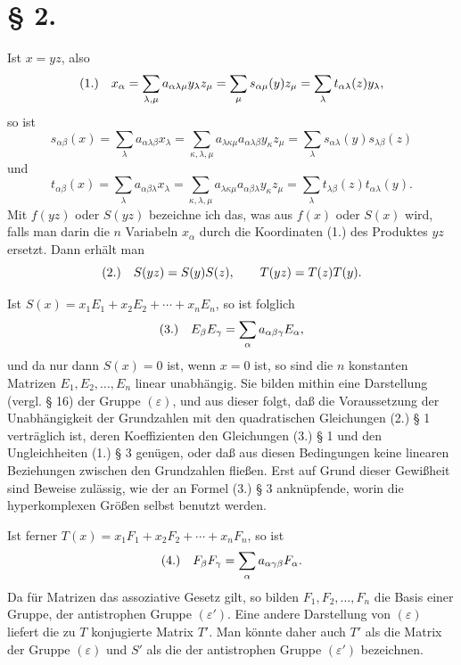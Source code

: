 \documentclass[11pt]{article}
\newcommand{\eps}{\varepsilon}
\newcommand{\fnum}[1]{\textup{(\ensuremath{#1}.)}\quad}
\begin{document}
\section*{§ 2.}

Ist $x=yz$, also
\[
\fnum{1} x_\alpha=\sum_{\lambda,\mu}a_{\alpha\lambda\mu}y_\lambda z_\mu
=\sum_\mu s_{\alpha\mu}(y)z_\mu=\sum_\lambda t_{\alpha\lambda}(z)y_\lambda,
\]
so ist
\[
s_{\alpha\beta}(x)=\sum_\lambda a_{\alpha\lambda\beta}x_\lambda
 =\sum_{\kappa,\lambda,\mu}a_{\lambda\kappa\mu}a_{\alpha\lambda\beta}y_\kappa z_\mu
 =\sum_\lambda s_{\alpha\lambda}(y)s_{\lambda\beta}(z)
\]
und
\[
t_{\alpha\beta}(x)=\sum_\lambda a_{\alpha\beta\lambda}x_\lambda
 =\sum_{\kappa,\lambda,\mu}a_{\lambda\kappa\mu}a_{\alpha\beta\lambda}y_\kappa z_\mu
 =\sum_\lambda t_{\lambda\beta}(z)t_{\alpha\lambda}(y).
\]
Mit $f(yz)$ oder $S(yz)$ bezeichne ich das, was aus $f(x)$ oder $S(x)$ wird, falls man darin die $n$ Variabeln $x_\alpha$ durch die Koordinaten (1.) des Produktes $yz$ ersetzt. Dann erhält man
\[
\fnum{2} S(yz)=S(y)S(z),\qquad T(yz)=T(z)T(y).
\]

Ist $S(x)=x_1E_1+x_2E_2+\cdots+x_nE_n$, so ist folglich
\[
\fnum{3} E_\beta E_\gamma=\sum_\alpha a_{\alpha\beta\gamma}E_\alpha,
\]
und da nur dann $S(x)=0$ ist, wenn $x=0$ ist, so sind die $n$ konstanten Matrizen $E_1,E_2,\ldots,E_n$ linear unabhängig. Sie bilden mithin eine Darstellung (vergl. § 16) der Gruppe $(\eps)$, und aus dieser folgt, daß die Voraussetzung der Unabhängigkeit der Grundzahlen mit den quadratischen Gleichungen (2.) § 1 verträglich ist, deren Koeffizienten den Gleichungen (3.) § 1 und den Ungleichheiten (1.) § 3 genügen, oder daß aus diesen Bedingungen keine linearen Beziehungen zwischen den Grundzahlen fließen. Erst auf Grund dieser Gewißheit sind Beweise zulässig, wie der an Formel (3.) § 3 anknüpfende, worin die hyperkomplexen Größen selbst benutzt werden.

Ist ferner $T(x)=x_1F_1+x_2F_2+\cdots+x_nF_n$, so ist
\[
\fnum{4} F_\beta F_\gamma=\sum_\alpha a_{\alpha\gamma\beta}F_\alpha.
\]
Da für Matrizen das assoziative Gesetz gilt, so bilden $F_1,F_2,\ldots,F_n$ die Basis einer Gruppe, der antistrophen Gruppe $(\eps')$. Eine andere Darstellung von $(\eps)$ liefert die zu $T$ konjugierte Matrix $T'$. Man könnte daher auch $T'$ als die Matrix der Gruppe $(\eps)$ und $S'$ als die der antistrophen Gruppe $(\eps')$ bezeichnen.
\end{document}
